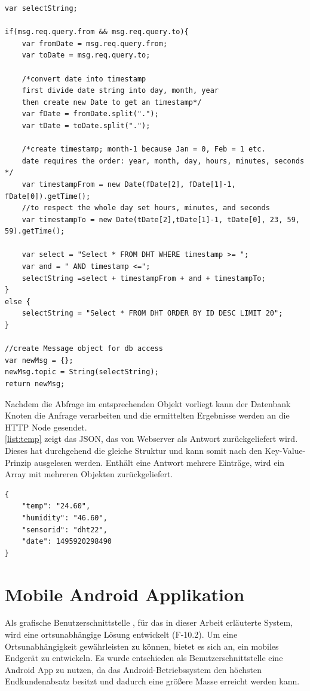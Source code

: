 \begin{lstlisting}[label=list:tempInt, caption={Funktion Node-RED tempInt}]
var selectString;

if(msg.req.query.from && msg.req.query.to){
	var fromDate = msg.req.query.from;
	var toDate = msg.req.query.to;
	
	/*convert date into timestamp
	first divide date string into day, month, year 
	then create new Date to get an timestamp*/
	var fDate = fromDate.split("."); 
	var tDate = toDate.split(".");
	
	/*create timestamp; month-1 because Jan = 0, Feb = 1 etc.
	date requires the order: year, month, day, hours, minutes, seconds */
	var timestampFrom = new Date(fDate[2], fDate[1]-1, fDate[0]).getTime();
	//to respect the whole day set hours, minutes, and seconds
	var timestampTo = new Date(tDate[2],tDate[1]-1, tDate[0], 23, 59, 59).getTime();
	
	var select = "Select * FROM DHT WHERE timestamp >= "; 
	var and = " AND timestamp <=";
	selectString =select + timestampFrom + and + timestampTo;
}
else {
	selectString = "Select * FROM DHT ORDER BY ID DESC LIMIT 20";
}

//create Message object for db access
var newMsg = {};
newMsg.topic = String(selectString);
return newMsg;
\end{lstlisting}

Nachdem die Abfrage im entsprechenden Objekt vorliegt kann der Datenbank Knoten die Anfrage verarbeiten und die ermittelten Ergebnisse werden an die \ac{HTTP} Node gesendet.
\\\autoref{list:temp}  zeigt das \ac{JSON}, das von Webserver als Antwort zurückgeliefert wird. Dieses hat durchgehend die gleiche Struktur und kann somit nach den Key-Value-Prinzip ausgelesen werden. Enthält eine Antwort mehrere Einträge, wird ein Array mit mehreren Objekten zurückgeliefert.
\begin{lstlisting}[label=list:temp, caption={Beispiel: JSON Response für den Pfad: /temp}]
{
	"temp": "24.60",
	"humidity": "46.60",
	"sensorid": "dht22",
	"date": 1495920298490
}
\end{lstlisting}

\section{Mobile Android Applikation}
Als grafische Benutzerschnittstelle , für das in dieser Arbeit erläuterte System, wird eine ortsunabhängige Lösung entwickelt (F-10.2). Um eine Ortsunabhängigkeit gewährleisten zu können, bietet es sich an, ein mobiles Endgerät zu entwickeln. Es wurde  entschieden als Benutzerschnittstelle eine Android App zu nutzen, da das Android-Betriebssystem den höchsten Endkundenabsatz besitzt \cite{statista:marktanteileandroid} und dadurch eine größere Masse erreicht werden kann.

